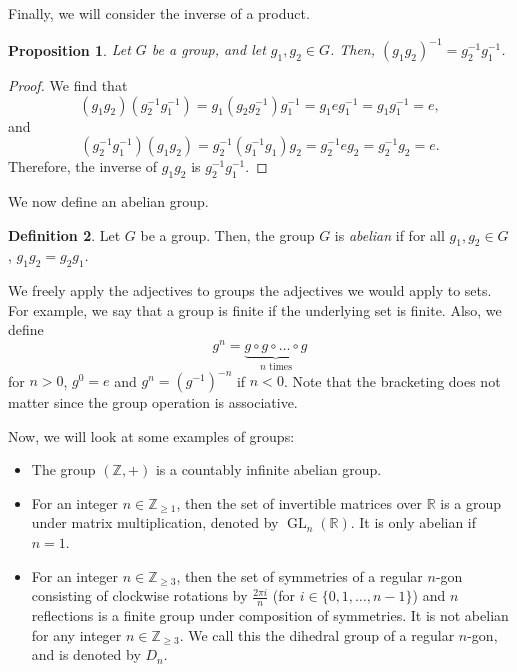 \documentclass[a4paper, openany]{memoir}
\theoremstyle{definition}
\newtheorem{definition}{Definition}[section]
\theoremstyle{plain}
\newtheorem{proposition}[definition]{Proposition}
\begin{document}
\noindent Finally, we will consider the inverse of a product.
\begin{proposition}
Let $G$ be a group, and let $g_1, g_2 \in G$. Then, $(g_1g_2)^{-1} = g_2^{-1} g_1^{-1}$.
\end{proposition}
\begin{proof}
We find that
\[(g_1g_2)(g_2^{-1} g_1^{-1}) = g_1 (g_2g_2^{-1}) g_1^{-1} = g_1 e g_1^{-1} = g_1g_1^{-1} = e,\]
and
\[(g_2^{-1} g_1^{-1})(g_1g_2) = g_2^{-1} (g_1^{-1}g_1) g_2 = g_2^{-1} e g_2 = g_2^{-1}g_2 = e.\]
Therefore, the inverse of $g_1 g_2$ is $g_2^{-1} g_1^{-1}$.
\end{proof}

We now define an abelian group.
\begin{definition}
Let $G$ be a group. Then, the group $G$ is \emph{abelian} if for all $g_1, g_2 \in G$, $g_1g_2 = g_2g_1$.
\end{definition}
\noindent We freely apply the adjectives to groups the adjectives we would apply to sets. For example, we say that a group is finite if the underlying set is finite. Also, we define
\[g^n = \underbrace{g \circ g \circ \dots \circ g}_{n \text{ times}}\]
for $n > 0$, $g^0 = e$ and $g^{n} = (g^{-1})^{-n}$ if $n < 0$. Note that the bracketing does not matter since the group operation is associative.

Now, we will look at some examples of groups:
\begin{itemize}
    \item The group $(\mathbb{Z}, +)$ is a countably infinite abelian group.
    \item For an integer $n \in \mathbb{Z}_{\geqslant 1}$, then the set of invertible matrices over $\mathbb{R}$ is a group under matrix multiplication, denoted by $\operatorname{GL}_n(\mathbb{R})$. It is only abelian if $n = 1$.
    \item For an integer $n \in \mathbb{Z}_{\geqslant 3}$, then the set of symmetries of a regular $n$-gon consisting of clockwise rotations by $\frac{2\pi i}{n}$ (for $i \in \{0, 1, \dots, n-1\}$) and $n$ reflections is a finite group under composition of symmetries. It is not abelian for any integer $n \in \mathbb{Z}_{\geqslant 3}$.
    We call this the dihedral group of a regular $n$-gon, and is denoted by $D_n$.
\end{itemize}
\end{document}
